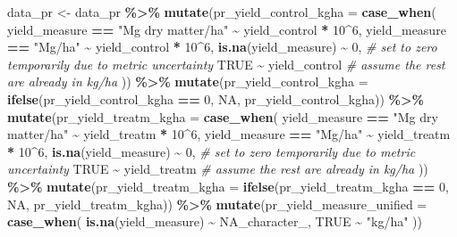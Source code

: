 \documentclass[
]{article}
\newenvironment{Shaded}{\begin{snugshade}}{\end{snugshade}}
\newcommand{\AttributeTok}[1]{\textcolor[rgb]{0.13,0.29,0.53}{#1}}
\newcommand{\CommentTok}[1]{\textcolor[rgb]{0.56,0.35,0.01}{\textit{#1}}}
\newcommand{\ConstantTok}[1]{\textcolor[rgb]{0.56,0.35,0.01}{#1}}
\newcommand{\DecValTok}[1]{\textcolor[rgb]{0.00,0.00,0.81}{#1}}
\newcommand{\FunctionTok}[1]{\textcolor[rgb]{0.13,0.29,0.53}{\textbf{#1}}}
\newcommand{\NormalTok}[1]{#1}
\newcommand{\OtherTok}[1]{\textcolor[rgb]{0.56,0.35,0.01}{#1}}
\newcommand{\SpecialCharTok}[1]{\textcolor[rgb]{0.81,0.36,0.00}{\textbf{#1}}}
\newcommand{\StringTok}[1]{\textcolor[rgb]{0.31,0.60,0.02}{#1}}
\begin{document}
\begin{Shaded}
\begin{Highlighting}[]
\NormalTok{data\_pr }\OtherTok{\textless{}{-}} 
\NormalTok{  data\_pr }\SpecialCharTok{\%\textgreater{}\%} 
  \FunctionTok{mutate}\NormalTok{(}\AttributeTok{pr\_yield\_control\_kgha =} \FunctionTok{case\_when}\NormalTok{(}
\NormalTok{    yield\_measure }\SpecialCharTok{==} \StringTok{"Mg dry matter/ha"} \SpecialCharTok{\textasciitilde{}}\NormalTok{ yield\_control }\SpecialCharTok{*} \DecValTok{10}\SpecialCharTok{\^{}}\DecValTok{6}\NormalTok{,}
\NormalTok{    yield\_measure }\SpecialCharTok{==} \StringTok{"Mg/ha"} \SpecialCharTok{\textasciitilde{}}\NormalTok{ yield\_control }\SpecialCharTok{*} \DecValTok{10}\SpecialCharTok{\^{}}\DecValTok{6}\NormalTok{,}
    \FunctionTok{is.na}\NormalTok{(yield\_measure) }\SpecialCharTok{\textasciitilde{}} \DecValTok{0}\NormalTok{, }\CommentTok{\# set to zero temporarily due to metric uncertainty}
    \ConstantTok{TRUE} \SpecialCharTok{\textasciitilde{}}\NormalTok{ yield\_control }\CommentTok{\# assume the rest are already in kg/ha}
\NormalTok{  )) }\SpecialCharTok{\%\textgreater{}\%} 
  \FunctionTok{mutate}\NormalTok{(}\AttributeTok{pr\_yield\_control\_kgha =} \FunctionTok{ifelse}\NormalTok{(pr\_yield\_control\_kgha }\SpecialCharTok{==} \DecValTok{0}\NormalTok{, }\ConstantTok{NA}\NormalTok{, pr\_yield\_control\_kgha)) }\SpecialCharTok{\%\textgreater{}\%} 
  \FunctionTok{mutate}\NormalTok{(}\AttributeTok{pr\_yield\_treatm\_kgha =} \FunctionTok{case\_when}\NormalTok{(}
\NormalTok{    yield\_measure }\SpecialCharTok{==} \StringTok{"Mg dry matter/ha"} \SpecialCharTok{\textasciitilde{}}\NormalTok{ yield\_treatm }\SpecialCharTok{*} \DecValTok{10}\SpecialCharTok{\^{}}\DecValTok{6}\NormalTok{,}
\NormalTok{    yield\_measure }\SpecialCharTok{==} \StringTok{"Mg/ha"} \SpecialCharTok{\textasciitilde{}}\NormalTok{ yield\_treatm }\SpecialCharTok{*} \DecValTok{10}\SpecialCharTok{\^{}}\DecValTok{6}\NormalTok{,}
    \FunctionTok{is.na}\NormalTok{(yield\_measure) }\SpecialCharTok{\textasciitilde{}} \DecValTok{0}\NormalTok{, }\CommentTok{\# set to zero temporarily due to metric uncertainty}
    \ConstantTok{TRUE} \SpecialCharTok{\textasciitilde{}}\NormalTok{ yield\_treatm }\CommentTok{\# assume the rest are already in kg/ha}
\NormalTok{  )) }\SpecialCharTok{\%\textgreater{}\%} 
  \FunctionTok{mutate}\NormalTok{(}\AttributeTok{pr\_yield\_treatm\_kgha =} \FunctionTok{ifelse}\NormalTok{(pr\_yield\_treatm\_kgha }\SpecialCharTok{==} \DecValTok{0}\NormalTok{, }\ConstantTok{NA}\NormalTok{, pr\_yield\_treatm\_kgha)) }\SpecialCharTok{\%\textgreater{}\%} 
  \FunctionTok{mutate}\NormalTok{(}\AttributeTok{pr\_yield\_measure\_unified =} \FunctionTok{case\_when}\NormalTok{(}
    \FunctionTok{is.na}\NormalTok{(yield\_measure) }\SpecialCharTok{\textasciitilde{}} \ConstantTok{NA\_character\_}\NormalTok{,}
    \ConstantTok{TRUE} \SpecialCharTok{\textasciitilde{}} \StringTok{"kg/ha"}
\NormalTok{  ))}
\end{Highlighting}
\end{Shaded}
\end{document}
